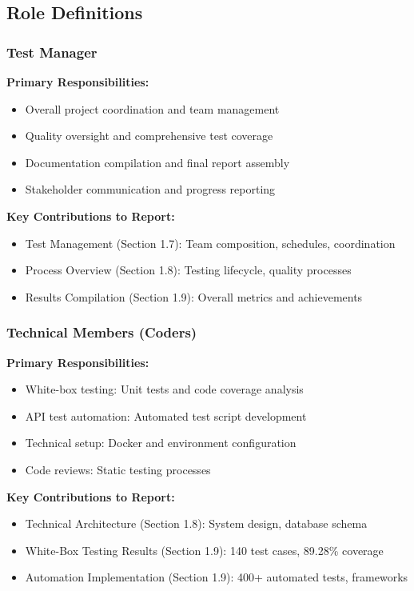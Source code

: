 \documentclass[12pt,a4paper]{article}
\begin{document}
\subsection{Role Definitions}

\subsubsection{Test Manager}
\textbf{Primary Responsibilities:}
\begin{itemize}[leftmargin=*]
    \item Overall project coordination and team management
    \item Quality oversight and comprehensive test coverage
    \item Documentation compilation and final report assembly
    \item Stakeholder communication and progress reporting
\end{itemize}

\textbf{Key Contributions to Report:}
\begin{itemize}[leftmargin=*]
    \item Test Management (Section 1.7): Team composition, schedules, coordination
    \item Process Overview (Section 1.8): Testing lifecycle, quality processes
    \item Results Compilation (Section 1.9): Overall metrics and achievements
\end{itemize}

\subsubsection{Technical Members (Coders)}
\textbf{Primary Responsibilities:}
\begin{itemize}[leftmargin=*]
    \item White-box testing: Unit tests and code coverage analysis
    \item API test automation: Automated test script development
    \item Technical setup: Docker and environment configuration
    \item Code reviews: Static testing processes
\end{itemize}

\textbf{Key Contributions to Report:}
\begin{itemize}[leftmargin=*]
    \item Technical Architecture (Section 1.8): System design, database schema
    \item White-Box Testing Results (Section 1.9): 140 test cases, 89.28\% coverage
    \item Automation Implementation (Section 1.9): 400+ automated tests, frameworks
\end{itemize}
\end{document}
